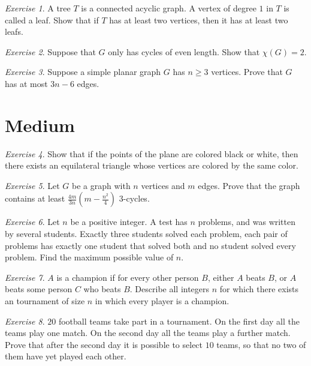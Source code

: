 \documentclass{article}
\theoremstyle{definition}
\theoremstyle{remark}
\newtheorem{exercise}{Exercise}
\begin{document}
\begin{exercise}
A tree $T$ is a connected acyclic graph. A vertex of degree $1$ in $T$ is called a leaf. Show that if $T$ has at least two vertices, then it has at least two leafs.  
\end{exercise}

\begin{exercise}
Suppose that $G$ only has cycles of even length. Show that $\chi(G) = 2$.
\end{exercise}

\begin{exercise}
Suppose a simple planar graph $G$ has $n \geq 3$ vertices. Prove that $G$ has at most $3n - 6$ edges. 
\end{exercise}

\section{Medium}
\begin{exercise}
Show that if the points of the plane are colored black or white, then there exists an equilateral triangle whose vertices are colored by the same color.
\end{exercise}

\begin{exercise}
Let $G$ be a graph with $n$ vertices and $m$ edges. Prove that the graph contains at least $\frac{4m}{3n}(m - \frac{n^{2}}{4})$ $3$-cycles.
\end{exercise}

\begin{exercise}
Let $n$ be a positive integer. A test has $n$ problems, and was written by several students. Exactly three students solved each problem, each pair of problems has exactly one student that solved both and no student solved every problem. Find the maximum possible value of $n$.
\end{exercise}

\begin{exercise}
$A$ is a champion if for every other person $B$, either $A$ beats $B$, or $A$ beats some person $C$ who beats $B$. Describe all integers $n$ for which there exists an tournament of size $n$ in which every player is a champion.
\end{exercise}

\begin{exercise}
$20$ football teams take part in a tournament. On the first day all the teams play one match. On the second day all the teams play a further match. Prove that after the second day it is possible to select $10$ teams, so that no two of them have yet played each other.
\end{exercise}
\end{document}
